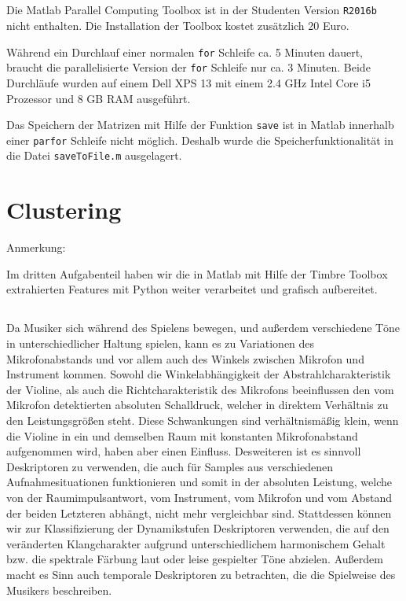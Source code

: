 \subsection{}
Die Matlab Parallel Computing Toolbox ist in der Studenten Version \texttt{R2016b} nicht enthalten.
Die Installation der Toolbox kostet zusätzlich 20 Euro.

Während ein Durchlauf einer normalen \texttt{for} Schleife ca. 5 Minuten dauert, braucht die parallelisierte Version der \texttt{for} Schleife nur ca. 3 Minuten.
Beide Durchläufe wurden auf einem Dell XPS 13 mit einem 2.4 GHz Intel Core i5 Prozessor und 8 GB RAM ausgeführt.

Das Speichern der Matrizen mit Hilfe der Funktion \texttt{save} ist in Matlab innerhalb einer \texttt{parfor} Schleife nicht möglich.
Deshalb wurde die Speicherfunktionalität in die Datei \texttt{saveToFile.m} ausgelagert.

\section{Clustering}
\label{sec:cluster}

Anmerkung:

Im dritten Aufgabenteil haben wir die in Matlab mit Hilfe der Timbre Toolbox extrahierten Features mit Python weiter verarbeitet und grafisch aufbereitet.

\subsection{}

Da Musiker sich während des Spielens bewegen, und außerdem verschiedene Töne in unterschiedlicher Haltung spielen, kann es zu Variationen des Mikrofonabstands und vor allem auch des Winkels zwischen Mikrofon und Instrument kommen. 
Sowohl die Winkelabhängigkeit der Abstrahlcharakteristik der Violine, als auch die Richtcharakteristik des Mikrofons beeinflussen den vom Mikrofon detektierten absoluten Schalldruck, welcher in direktem Verhältnis zu den Leistungsgrößen steht. 
Diese Schwankungen sind verhältnismäßig klein, wenn die Violine in ein und demselben Raum mit konstanten Mikrofonabstand aufgenommen wird, haben aber einen Einfluss.
Desweiteren ist es sinnvoll Deskriptoren zu verwenden, die auch für Samples aus verschiedenen Aufnahmesituationen funktionieren und somit in der absoluten Leistung, welche von der Raumimpulsantwort, vom Instrument, vom Mikrofon und vom Abstand der beiden Letzteren abhängt, nicht mehr vergleichbar sind.
Stattdessen können wir zur Klassifizierung der Dynamikstufen Deskriptoren verwenden, die auf den veränderten Klangcharakter aufgrund unterschiedlichem harmonischem Gehalt bzw. die spektrale Färbung laut oder leise gespielter Töne abzielen.
Außerdem macht es Sinn auch temporale Deskriptoren zu betrachten, die die Spielweise des Musikers beschreiben.
